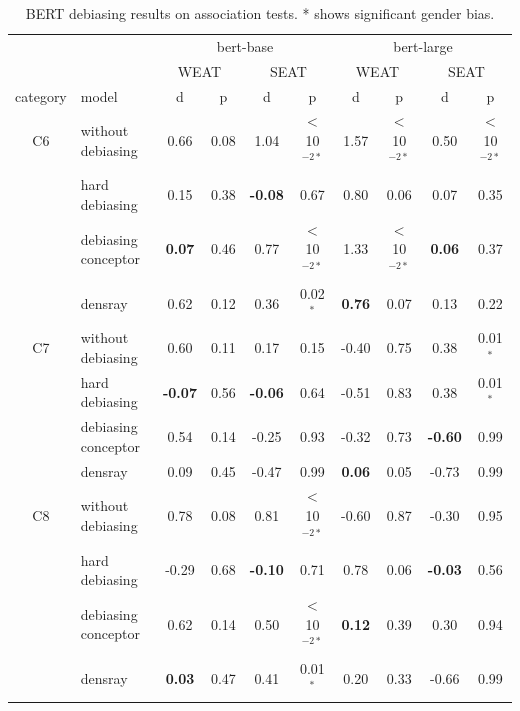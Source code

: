\begin{table}[h]
	\centering
	\footnotesize
	\begin{tabular}{cl{|}cccc{|}cccc}
		\hline
		&&\multicolumn{4}{c|}{bert-base}&\multicolumn{4}{c}{bert-large}\\
		&&\multicolumn{2}{c}{WEAT}&\multicolumn{2}{c|}{SEAT}&\multicolumn{2}{c}{WEAT}&\multicolumn{2}{c}{SEAT}\\
		\hline
		category & model & d & p& d & p& d & p& d & p\\
		\hline
		C6 & without debiasing & 0.66 & 0.08 &1.04&$<$10$^{-2*}$& 1.57 & $<$10$^{-2*}$ &0.50&$<$10$^{-2*}$\\
		& hard debiasing& 0.15 & 0.38&\textbf{-0.08}&0.67& 0.80 & 0.06&0.07&0.35\\
		& debiasing conceptor & \textbf{0.07} & 0.46&0.77&$<$10$^{-2*}$ & 1.33 & $<$10$^{-2*}$&\textbf{0.06}&0.37\\
		&densray & 0.62 & 0.12&0.36&0.02$^{*}$ & \textbf{0.76} & 0.07&0.13&0.22\\
		\hline
		C7 & without debiasing & 0.60 & 0.11 &0.17&0.15 & -0.40 & 0.75 &0.38&0.01$^{*}$\\
		& hard debiasing & \textbf{-0.07} & 0.56&\textbf{-0.06}&0.64 & -0.51 & 0.83&0.38&0.01$^{*}$\\
		& debiasing conceptor & 0.54 & 0.14&-0.25&0.93 & -0.32 & 0.73&\textbf{-0.60}&0.99\\
		& densray & 0.09 & 0.45&-0.47&0.99 & \textbf{0.06} & 0.05&-0.73&0.99\\
		\hline
		C8& without debiasing & 0.78 & 0.08 &0.81&$<$10$^{-2*}$ & -0.60 & 0.87 &-0.30&0.95\\
		& hard debiasing & -0.29 & 0.68&\textbf{-0.10}&0.71 & 0.78 & 0.06&\textbf{-0.03}&0.56\\
		& debiasing conceptor & 0.62 & 0.14&0.50&$<$10$^{-2*}$& \textbf{0.12} & 0.39&0.30&0.94\\
		& densray & \textbf{0.03} & 0.47&0.41&0.01$^{*}$ & 0.20 & 0.33&-0.66&0.99\\
		\hline
	\end{tabular}
	\caption{
		BERT debiasing results on association tests. * shows significant gender bias.}
\end{table}

